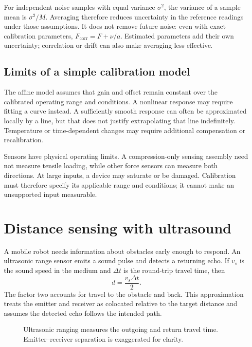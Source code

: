 For independent noise samples with equal variance $\sigma^2$, the variance
of a sample mean is $\sigma^2/M$. Averaging therefore reduces uncertainty
in the reference readings under those assumptions. It does not remove
future noise: even with exact calibration parameters,
$F_{\mathrm{corr}}=F+\nu/a$. Estimated parameters add their own uncertainty;
correlation or drift can also make averaging less effective.

\subsection{Limits of a simple calibration model}
The affine model assumes that gain and offset remain constant over the
calibrated operating range and conditions. A nonlinear response may require
fitting a curve instead. A sufficiently smooth response can often be
approximated locally by a line, but that does not justify extrapolating
that line indefinitely. Temperature or time-dependent changes may require
additional compensation or recalibration.

Sensors have physical operating limits. A compression-only sensing assembly
need not measure tensile loading, while other force sensors can measure both
directions. At large inputs, a device may saturate or be damaged. Calibration
must therefore specify its applicable range and conditions; it cannot make
an unsupported input measurable.

\section{Distance sensing with ultrasound}
A mobile robot needs information about obstacles early enough to respond.
An ultrasonic range sensor emits a sound pulse and detects a returning echo.
If $v_s$ is the sound speed in the medium and $\Delta t$ is the round-trip
travel time, then
\begin{equation}
 \boxed{d=\frac{v_s\Delta t}{2}.}
 \label{eq:l06-sonar}
\end{equation}
The factor two accounts for travel to the obstacle and back. This approximation
treats the emitter and receiver as colocated relative to the target distance
and assumes the detected echo follows the intended path.

\begin{figure}[htbp]
\centering
\caption{Ultrasonic ranging measures the outgoing and return travel time.
Emitter--receiver separation is exaggerated for clarity.}
\label{fig:l06-sonar}
\end{figure}

